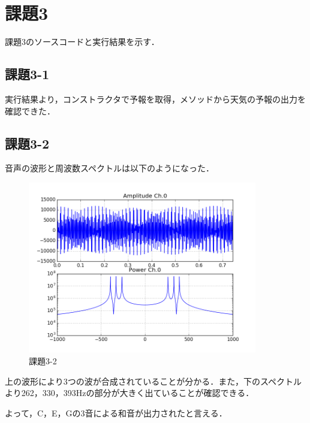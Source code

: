 \section{課題3}
課題3のソースコードと実行結果を示す．


\subsection{課題3-1}


実行結果より，コンストラクタで予報を取得，メソッドから天気の予報の出力を確認できた．

\subsection{課題3-2}


音声の波形と周波数スペクトルは以下のようになった．

\begin{figure}[h]
  \begin{center}
    \includegraphics[width=10cm]{./img/kadai3-2.png}
    \caption{課題3-2}
  \end{center}
\end{figure}

上の波形により3つの波が合成されていることが分かる．また，下のスペクトルより262，330，393Hzの部分が大きく出ていることが確認できる．

よって，C，E，Gの3音による和音が出力されたと言える．
